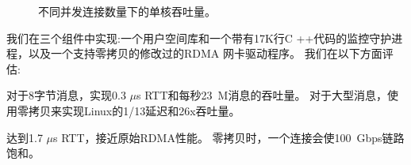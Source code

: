 \begin{figure}[htbp]
		\centering
		
		\caption{不同并发连接数量下的单核吞吐量。}
		\label{socksdirect:fig:eval-connnum-tput}
\end{figure}


我们在三个组件中实现\sys :一个用户空间库\libipc {}和一个带有17K行C ++代码的监控守护进程，以及一个支持零拷贝的修改过的RDMA 网卡驱动程序。 我们在以下方面评估\sys :

对于8字节消息，\sys 实现0.3 $\mu$s RTT和每秒23~M消息的吞吐量。 对于大型消息，\sys 使用零拷贝来实现Linux的1/13延迟和26x吞吐量。

\sys 达到1.7 $\mu$s RTT，接近原始RDMA性能。
零拷贝时，一个连接会使100~Gbps链路饱和。

